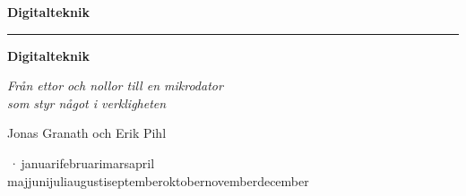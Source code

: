 %
\providecommand{\bookversion}{}
\newcommand{\bookdate}{\number\day\space\ifcase\month\or januari\or februari\or mars\or april\or
  maj\or juni\or juli\or augusti\or september\or oktober\or november\or december\fi\space
  \number\year}
\newcommand{\bookedition}{\ifx\bookversion\empty\else\bookversion\,·\,\fi\bookdate}

\thispagestyle{empty}
\vspace*{2.2in}
\begin{flushright}
  {\Large\bfseries Digitalteknik}
\end{flushright}
\cleardoublepage

\thispagestyle{empty}
\vspace*{1.1in}
\begin{flushleft}
  {\color{accent}\rule{0.9in}{2.5pt}}\par\vspace{1.4ex}
  {\fontsize{32}{38}\selectfont\bfseries Digitalteknik\par}
  \vspace{2.2ex}
  {\Large\itshape Från ettor och nollor till en mikrodator\\som styr något i verkligheten\par}
  \vspace{1.2in}
  {\large Jonas Granath och Erik Pihl\par}
  \vfill
  {\small\color{muted} \bookedition\par}
\end{flushleft}
\newpage

